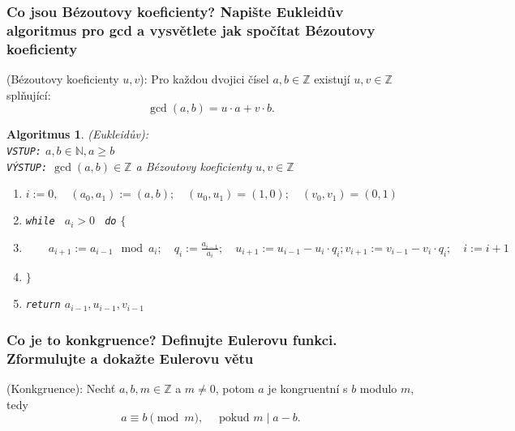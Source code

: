 \documentclass[10pt,a4paper]{article}
\newtheorem{algoritmus}{Algoritmus}
\newcommand{\N}{{\mathbb{N}}}       %
\newcommand{\Z}{{\mathbb{Z}}}       %
\begin{document}
\subsubsection{Co jsou Bézoutovy koeficienty? Napište Eukleidův algoritmus pro gcd a vysvětlete jak spočítat Bézoutovy koeficienty}

 (Bézoutovy koeficienty $u,v$): \normalfont Pro každou dvojici čísel $a, b\in \Z$ existují $u, v\in \Z$ splňující:
$$\gcd(a,b) = u\cdot a + v \cdot b.$$

\begin{algoritmus} (Eukleidův): \normalfont\\
    \texttt{VSTUP:} $a,b\in \N, a \geq b$\\
    \texttt{VÝSTUP:} $\gcd(a,b)\in \Z$ a Bézoutovy koeficienty $u,v \in \Z$
    \begin{enumerate} \itemsep0em
        \item $i := 0, \quad (a_0, a_1):=(a,b); \quad (u_0, u_1)=(1,0); \quad (v_0, v_1) = (0,1)$
        \item \texttt{while } $a_i > 0$ \texttt{ do} $\{$
        \item $\qquad a_{i+1} := a_{i-1} \mod a_i; \quad q_i := \frac{a_{i-1}}{a_i}; \quad u_{i+1}:= u_{i-1} - u_i \cdot q_i; v_{i+1}:= v_{i-1} - v_i \cdot q_i; \quad i:=i+1$
        \item $\}$
        \item \texttt{return} $a_{i-1}, u_{i-1}, v_{i-1}$
    \end{enumerate}
\end{algoritmus}


\subsubsection{Co je to konkgruence?  Definujte Eulerovu funkci.  Zformulujte a dokažte Eulerovu větu}

 (Konkgruence): \normalfont Nechť $a,b,m \in \Z$ a $m\neq 0$, potom $a$ je kongruentní s $b$ modulo $m$, tedy $$a\equiv b \pmod m, \quad \text{ pokud }m \mid a - b.$$
\end{document}
